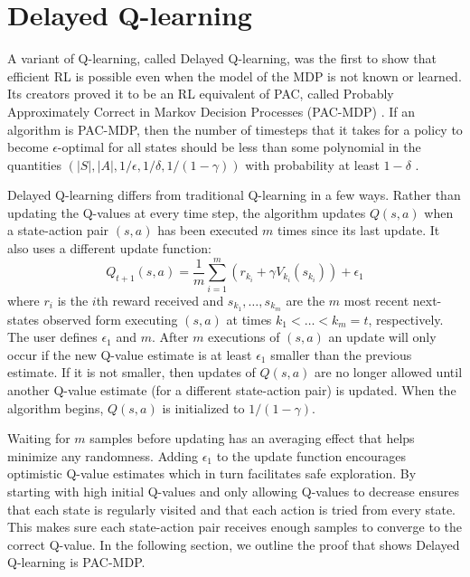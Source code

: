 \documentclass{article} %
\begin{document}


\section{Delayed Q-learning}
A variant of Q-learning, called Delayed Q-learning, was the first to show that efficient RL is possible even when the model of the MDP is not known or learned.  Its creators proved it to be an RL equivalent of PAC, called Probably Approximately Correct in Markov Decision Processes (PAC-MDP) \cite{strehl_pac_2006}.  If an algorithm is PAC-MDP, then the number of timesteps that it takes for a policy to become $\epsilon$-optimal for all states should be less than some polynomial in the quantities $(\left|S\right|,\left|A\right|,1/\epsilon,1/\delta,1/(1-\gamma))$ with probability at least $1-\delta$ \cite{kakade}.


Delayed Q-learning differs from traditional Q-learning in a few ways.  Rather than updating the Q-values at every time step, the algorithm updates $Q(s,a)$ when a state-action pair $(s,a)$ has been executed $m$ times since its last update.  It also uses a different update function:
$$Q_{t+1}(s,a) = \frac{1}{m}\sum_{i=1}^m(r_{k_i}+\gamma V_{k_i}(s_{k_i})) + \epsilon_1$$  
where $r_i$ is the $i$th reward received and $s_{k_1},\dots,s_{k_m}$ are the $m$ most recent next-states observed form executing $(s,a)$ at times $k_1 < \dots < k_m = t$, respectively. The user defines $\epsilon_1$ and $m$.  After $m$ executions of $(s,a)$ an update will only occur if the new Q-value estimate is at least $\epsilon_1$ smaller than the previous estimate.  If it is not smaller, then updates of $Q(s,a)$ are no longer allowed until another Q-value estimate (for a different state-action pair) is updated.  When the algorithm begins, $Q(s,a)$ is initialized to $1/(1-\gamma)$.

Waiting for $m$ samples before updating has an averaging effect that helps minimize any randomness. Adding $\epsilon_1$ to the update function encourages optimistic Q-value estimates which in turn facilitates safe exploration. By starting with high initial Q-values and only allowing Q-values to decrease ensures that each state is regularly visited and that each action is tried from every state.  This makes sure each state-action pair receives enough samples to converge to the correct Q-value.  In the following section, we outline the proof that shows Delayed Q-learning is PAC-MDP.
\end{document}
